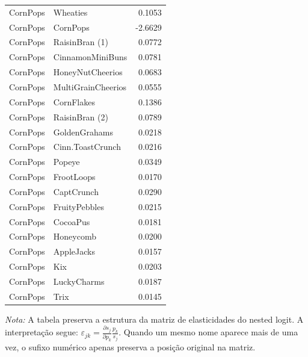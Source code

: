 \begin{table}[H]
\begin{tabular}{llr}
CornPops & Wheaties & 0.1053 \\
CornPops & CornPops & -2.6629 \\
CornPops & RaisinBran (1) & 0.0772 \\
CornPops & CinnamonMiniBuns & 0.0781 \\
CornPops & HoneyNutCheerios & 0.0683 \\
CornPops & MultiGrainCheerios & 0.0555 \\
CornPops & CornFlakes & 0.1386 \\
CornPops & RaisinBran (2) & 0.0789 \\
CornPops & GoldenGrahams & 0.0218 \\
CornPops & Cinn.ToastCrunch & 0.0216 \\
CornPops & Popeye & 0.0349 \\
CornPops & FrootLoops & 0.0170 \\
CornPops & CaptCrunch & 0.0290 \\
CornPops & FruityPebbles & 0.0215 \\
CornPops & CocoaPus & 0.0181 \\
CornPops & Honeycomb & 0.0200 \\
CornPops & AppleJacks & 0.0157 \\
CornPops & Kix & 0.0203 \\
CornPops & LuckyCharms & 0.0187 \\
CornPops & Trix & 0.0145 \\
\bottomrule
\end{tabular}

\vspace{0.3em}
\footnotesize
\textit{Nota:} A tabela preserva a estrutura da matriz de elasticidades do nested logit. A interpretação segue: $\varepsilon_{jk}=\frac{\partial s_j}{\partial p_k}\frac{p_k}{s_j}$. Quando um mesmo nome aparece mais de uma vez, o sufixo numérico apenas preserva a posição original na matriz.
\end{table}
\endgroup


